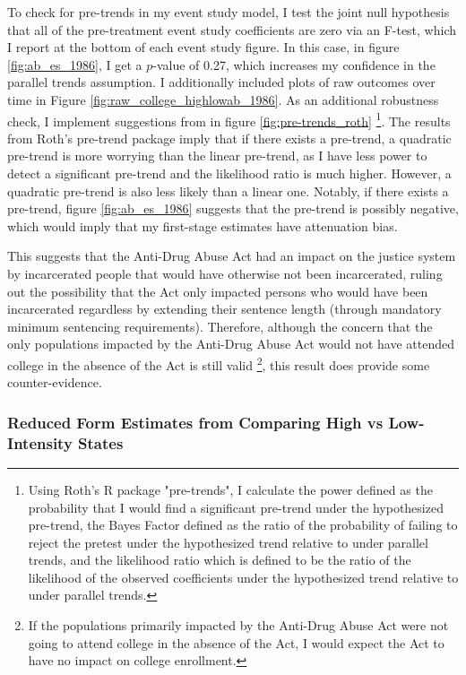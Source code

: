 \documentclass{article}
\begin{document}
To check for pre-trends in my event study model, I test the joint null hypothesis that all of the pre-treatment event study coefficients are zero via an F-test, which I report at the bottom of each event study figure. In this case, in figure \ref{fig:ab_es_1986}, I get a $p$-value of 0.27, which increases my confidence in the parallel trends assumption. I additionally included plots of raw outcomes over time in Figure \ref{fig:raw_college_highlowab_1986}. As an additional robustness check, I implement suggestions from \cite{roth2022} in figure \ref{fig:pre-trends_roth} \footnote{Using Roth's R package "pre-trends", I calculate the power defined as the probability that I would find a significant pre-trend under the hypothesized pre-trend, the Bayes Factor defined as the ratio of the probability of failing to reject the pretest under the hypothesized trend relative to under parallel trends, and the likelihood ratio which is defined to be the ratio of the likelihood of the observed coefficients under the hypothesized trend relative to under parallel trends.}. The results from Roth's pre-trend package imply that if there exists a pre-trend, a quadratic pre-trend is more worrying than the linear pre-trend, as I have less power to detect a significant pre-trend and the likelihood ratio is much higher. However, a quadratic pre-trend is also less likely than a linear one. Notably, if there exists a pre-trend, figure \ref{fig:ab_es_1986} suggests that the pre-trend is possibly negative, which would imply that my first-stage estimates have attenuation bias.

This suggests that the Anti-Drug Abuse Act had an impact on the justice system by incarcerated people that would have otherwise not been incarcerated, ruling out the possibility that the Act only impacted persons who would have been incarcerated regardless by extending their sentence length (through mandatory minimum sentencing requirements). Therefore, although the concern that the only populations impacted by the Anti-Drug Abuse Act would not have attended college in the absence of the Act is still valid \footnote{If the populations primarily impacted by the Anti-Drug Abuse Act were not going to attend college in the absence of the Act, I would expect the Act to have no impact on college enrollment.}, this result does provide some counter-evidence.

\subsubsection{Reduced Form Estimates from Comparing High vs Low-Intensity States}
\end{document}
